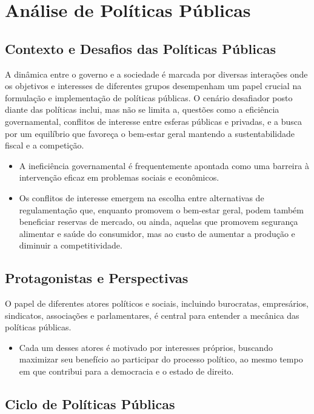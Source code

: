 \documentclass[
   article,       
   12pt,          
   oneside,       
   a4paper,       
   english,       
   brazil,        
   sumario=tradicional
   ]{abntex2}
\begin{document}
\section{Análise de Políticas Públicas}

\subsection{Contexto e Desafios das Políticas Públicas}

A dinâmica entre o governo e a sociedade é marcada por diversas interações onde os objetivos e interesses de diferentes grupos desempenham um papel crucial na formulação e implementação de políticas públicas. O cenário desafiador posto diante das políticas inclui, mas não se limita a, questões como a eficiência governamental, conflitos de interesse entre esferas públicas e privadas, e a busca por um equilíbrio que favoreça o bem-estar geral mantendo a sustentabilidade fiscal e a competição.

\begin{itemize}
    \item A ineficiência governamental é frequentemente apontada como uma barreira à intervenção eficaz em problemas sociais e econômicos.
    \item Os conflitos de interesse emergem na escolha entre alternativas de regulamentação que, enquanto promovem o bem-estar geral, podem também beneficiar reservas de mercado, ou ainda, aquelas que promovem segurança alimentar e saúde do consumidor, mas ao custo de aumentar a produção e diminuir a competitividade.
\end{itemize}

\subsection{Protagonistas e Perspectivas}

O papel de diferentes atores políticos e sociais, incluindo burocratas, empresários, sindicatos, associações e parlamentares, é central para entender a mecânica das políticas públicas.

\begin{itemize}
    \item Cada um desses atores é motivado por interesses próprios, buscando maximizar seu benefício ao participar do processo político, ao mesmo tempo em que contribui para a democracia e o estado de direito.
\end{itemize}

\subsection{Ciclo de Políticas Públicas}
\end{document}
